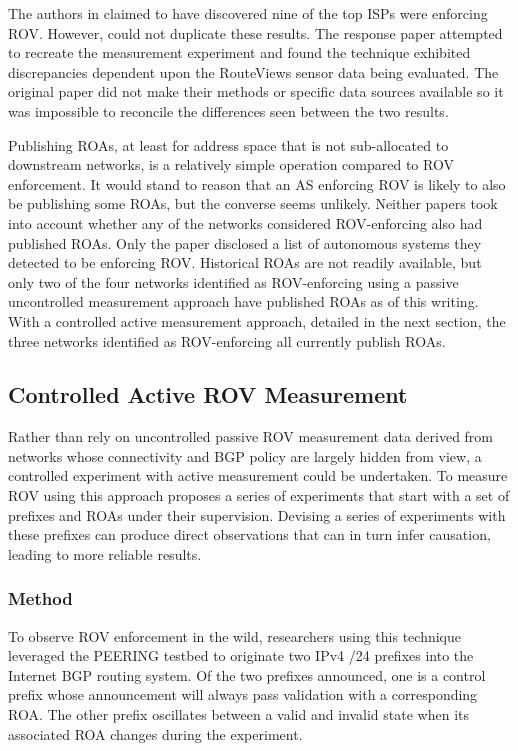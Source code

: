 \documentclass[sigconf]{acmart}
\begin{document}
The authors in \cite{gilad_are_2017} claimed to have discovered nine of
the top ISPs were enforcing ROV.  However, \cite{reuter_towards_2018}
could not duplicate these results.  The response paper attempted to
recreate the measurement experiment and found the technique exhibited
discrepancies dependent upon the RouteViews sensor data being
evaluated.  The original paper did not make their methods or specific
data sources available so it was impossible to reconcile the differences
seen between the two results.

Publishing ROAs, at least for address space that is not sub-allocated to
downstream networks, is a relatively simple operation compared to ROV
enforcement.  It would stand to reason that an AS enforcing ROV is
likely to also be publishing some ROAs, but the converse seems unlikely.
Neither papers took into account whether any of the networks considered
ROV-enforcing also had published ROAs.  Only
the\cite{reuter_towards_2018} paper disclosed a list of autonomous
systems they detected to be enforcing ROV.  Historical ROAs are not
readily available, but only two of the four networks identified as
ROV-enforcing using a passive uncontrolled measurement approach have
published ROAs as of this writing.  With a controlled active
measurement approach, detailed in the next section, the three networks
identified as ROV-enforcing all currently publish ROAs.

\subsection{Controlled Active ROV Measurement}

Rather than rely on uncontrolled passive ROV measurement data derived
from networks whose connectivity and BGP policy are largely hidden from
view, a controlled experiment with active measurement could be
undertaken.  To measure ROV using this approach
\cite{reuter_towards_2018} proposes a series of experiments that start
with a set of prefixes and ROAs under their supervision.  Devising a
series of experiments with these prefixes can produce direct
observations that can in turn infer causation, leading to more reliable
results.

\subsubsection{Method}

To observe ROV enforcement in the wild, researchers using this technique
leveraged the PEERING testbed to originate two IPv4 /24 prefixes into
the Internet BGP routing system.\cite{schlinker_peering:_2014}  Of the
two prefixes announced, one is a control prefix whose announcement will
always pass validation with a corresponding ROA.  The other prefix
oscillates between a valid and invalid state when its associated ROA
changes during the experiment.
\end{document}
